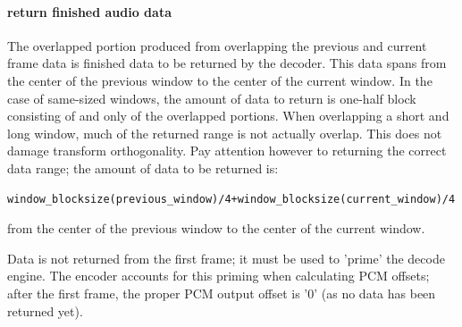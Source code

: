 \paragraph{return finished audio data}

The overlapped portion produced from overlapping the previous and
current frame data is finished data to be returned by the decoder.
This data spans from the center of the previous window to the center
of the current window.  In the case of same-sized windows, the amount
of data to return is one-half block consisting of and only of the
overlapped portions. When overlapping a short and long window, much of
the returned range is not actually overlap.  This does not damage
transform orthogonality.  Pay attention however to returning the
correct data range; the amount of data to be returned is:

\begin{Verbatim}[commandchars=\\\{\}]
window_blocksize(previous_window)/4+window_blocksize(current_window)/4
\end{Verbatim}

from the center of the previous window to the center of the current
window.

Data is not returned from the first frame; it must be used to 'prime'
the decode engine.  The encoder accounts for this priming when
calculating PCM offsets; after the first frame, the proper PCM output
offset is '0' (as no data has been returned yet).
